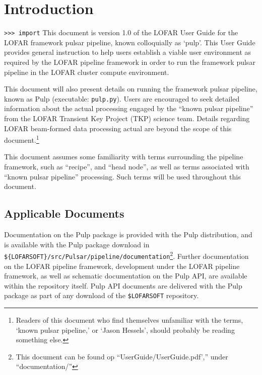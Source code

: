 \documentclass[a4paper,10pt,bibtotoc]{scrartcl}
\begin{document}
\section{Introduction}
\label{sec:introduction}
\verb|>>> import| This document is version 1.0 of the LOFAR User Guide for the LOFAR
framework pulsar pipeline, known colloquially as `pulp'.  This User
Guide provides general instruction to help users establish a viable user environment
as required by the LOFAR pipeline framework in order to run
the framework pulsar pipeline in the LOFAR cluster compute environment.

This document will also present details on running the
framework pulsar pipeline, known as Pulp (executable: \verb|pulp.py|).
Users are encouraged to seek detailed information about the
actual processing engaged by the ``known pulsar pipeline'' from the
LOFAR Transient Key Project (TKP) science team. Details
regarding LOFAR beam-formed data processing actual are beyond the scope of this
document.\footnote{Readers of this
  document who find themselves unfamiliar with the terms, `known pulsar
  pipeline,'  or `Jason Hessels', should probably be reading something else.}

This document assumes some familiarity with terms surrounding the pipeline
framework, such as ``recipe'',  and ``head node'', as well as terms
associated with ``known pulsar pipeline'' processing. Such terms will
be used throughout this document.

\subsection{Applicable Documents}
Documentation on the Pulp package is provided with the Pulp
distribution, and is available with the Pulp package download in
\verb|${LOFARSOFT}/src/Pulsar/pipeline/documentation|\footnote{This
  document can be found op ``UserGuide/UserGuide.pdf','' under
  ``documentation/''}. Further documentation on the LOFAR pipeline
framework, development under the LOFAR pipeline framework,  as well as schematic
documentation on the Pulp API, are available within the repository
itself. Pulp API documents are delivered with the Pulp package as
part of any download of the \verb|$LOFARSOFT| repository.
\end{document}
